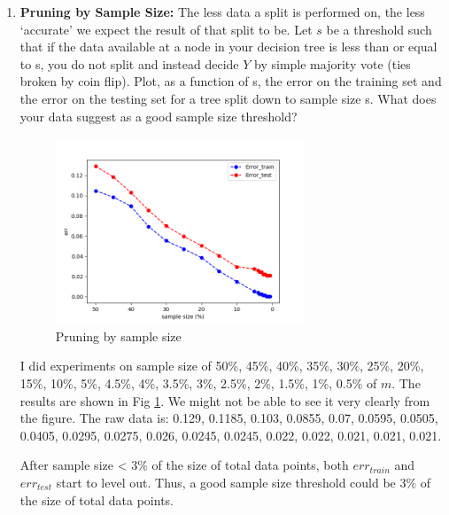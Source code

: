 \documentclass[letter, 12pt]{article}
\begin{document}
\begin{enumerate}
\begin{enumerate}
        	\item {\textbf{Pruning by Sample Size:} The less data a split is performed on, the less `accurate' we expect the
        		result of that split to be. Let $ s $ be a threshold such that if the data available at a node in your decision
        		tree is less than or equal to s, you do not split and instead decide $ Y $ by simple majority vote (ties broken
        		by coin flip). Plot, as a function of s, the error on the training set and the error on the testing set for a
        		tree split down to sample size s. What does your data suggest as a good sample size threshold?}
        	\begin{figure}[H]
        		\centering
        		\includegraphics[width=0.7\textwidth]{q3-2.png}
        		\caption{Pruning by sample size}
        		\label{q32}
        	\end{figure}
        	\par{I did experiments on sample size of 50\%, 45\%, 40\%, 35\%, 30\%, 25\%, 20\%, 15\%, 10\%, 5\%, 4.5\%, 4\%, 3.5\%, 3\%, 2.5\%, 2\%, 1.5\%, 1\%, 0.5\% of $ m $. The results are shown in Fig \ref{q32}. We might not be able to see it very clearly from the figure. The raw data is: 0.129, 0.1185, 0.103, 0.0855, 0.07, 0.0595, 0.0505, 0.0405, 0.0295, 0.0275, 0.026, 0.0245, 0.0245, 0.022, 0.022, 0.021, 0.021, 0.021.}
        	\par{After sample size < 3\% of the size of total data points, both $ err_{train} $ and $ err_{test} $ start to level out. Thus, a good sample size threshold could be 3\% of the size of total data points.}
        

\end{enumerate}
\end{enumerate}
\end{document}
